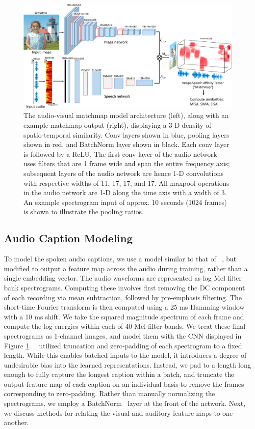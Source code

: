 \begin{figure}[h]
    \centering
    \includegraphics[width=1\linewidth]{figures/images_paper/matchmap_model_vis2.png}
    \caption[Audio-visual matchmap model architecture and matchmap example]{The audio-visual matchmap model architecture (left), along with an example matchmap output (right), displaying a 3-D density of spatio-temporal similarity. Conv layers shown in blue, pooling layers shown in red, and BatchNorm layer shown in black. Each conv layer is followed by a ReLU. The first conv layer of the audio network uses filters that are 1 frame wide and span the entire frequency axis; subsequent layers of the audio network are hence 1-D convolutions with respective widths of 11, 17, 17, and 17. All maxpool operations in the audio network are 1-D along the time axis with a width of 3. An example spectrogram input of approx. 10 seconds (1024 frames) is shown to illustrate the pooling ratios.}
    \label{fig:matchmap_model}
\end{figure}

\subsection{Audio Caption Modeling}
To model the spoken audio captions, we use a model similar to that of ~\cite{harwath_acl_2017}, but modified to output a feature map across the audio during training, rather than a single embedding vector. The audio waveforms are represented as log Mel filter bank spectrograms. Computing these involves first removing the DC component of each recording via mean subtraction, followed by pre-emphasis filtering. The short-time Fourier transform is then computed using a 25 ms Hamming window with a 10 ms shift. We take the squared magnitude spectrum of each frame and compute the log energies within each of 40 Mel filter bands. We treat these final spectrograms as 1-channel images, and model them with the CNN displayed in Figure \ref{fig:matchmap_model}. ~\cite{harwath_nips} utilized truncation and zero-padding of each spectrogram to a fixed length. While this enables batched inputs to the model, it introduces a degree of undesirable bias into the learned representations. Instead, we pad to a length long enough to fully capture the longest caption within a batch, and truncate the output feature map of each caption on an individual basis to remove the frames corresponding to zero-padding. Rather than manually normalizing the spectrograms, we employ a BatchNorm~\cite{batchnorm} layer at the front of the network. Next, we discuss methods for relating the visual and auditory feature maps to one another.

